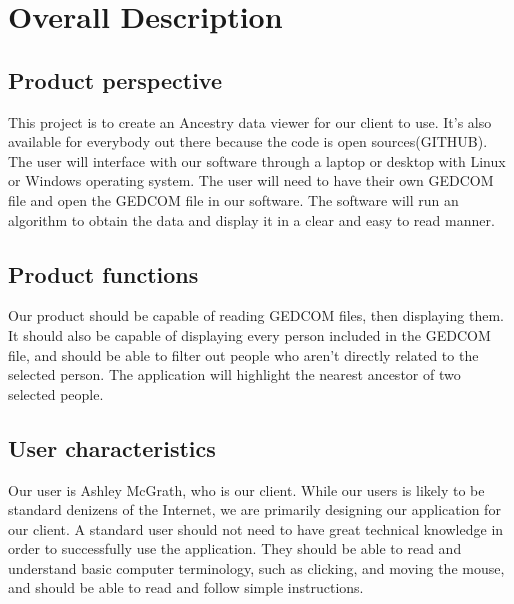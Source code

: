 \documentclass[onecolumn, draftclsnofoot, 10pt, compsoc]{IEEEtran}
\begin{document}
\section{Overall Description}
\subsection{Product perspective}
\begin{singlespace}
This project is to create an Ancestry data viewer for our client to use. It’s also available for everybody out there because the code is open sources(GITHUB). The user will interface with our software through a laptop or desktop with Linux or Windows operating system. The user will need to have their own GEDCOM file and open the GEDCOM file in our software. The software will run an algorithm to obtain the data and display it in a clear and easy to read manner.
\end{singlespace}

\subsection{Product functions}
\begin{singlespace}
Our product should be capable of reading GEDCOM files, then displaying them. It should also be capable of displaying every person included in the GEDCOM file, and should be able to filter out people who aren’t directly related to the selected person. The application will highlight the nearest ancestor of two selected people.
\end{singlespace}

\subsection{User characteristics}
\begin{singlespace}
Our user is Ashley McGrath, who is our client. While our users is likely to be standard denizens of the Internet, we are primarily designing our application for our client. 
\newline
\newline
A standard user should not need to have great technical knowledge in order to successfully use the application. They should be able to read and understand basic computer terminology, such as clicking, and moving the mouse, and should be able to read and follow simple instructions.

\end{singlespace}
\end{document}
